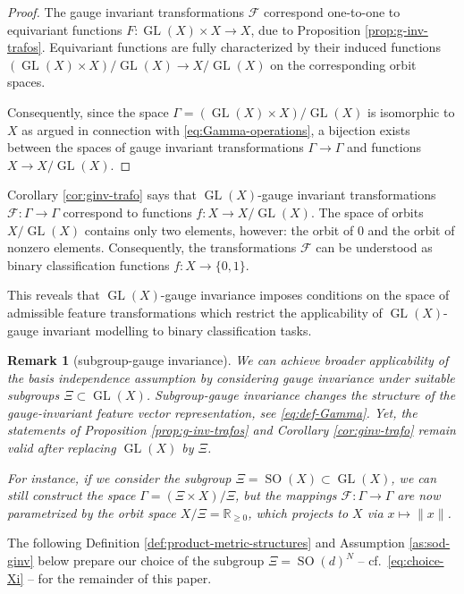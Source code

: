 \documentclass[10pt,reqno]{amsart}
\numberwithin{equation}{section}
\theoremstyle{bfnote}
\theoremstyle{bfdef}
\newtheorem{remark}[theorem]{Remark}
\newcommand{\mc}[1]{\mathcal{#1}}
\newcommand{\R}{\mathbb{R}}
\DeclareMathOperator{\SO}{SO}
\DeclareMathOperator{\GL}{GL}
\providecommand\X; %
\renewcommand{\X}{X}
\begin{document}
	\begin{proof}
		The gauge invariant transformations $\mc{F}$ correspond one-to-one to equivariant functions $F : \GL(\X) \times \X \to \X$, due to Proposition \ref{prop:g-inv-trafos}. Equivariant functions are fully characterized by their induced functions $(\GL(\X) \times \X) / \GL(\X) \to \X / \GL(X)$ on the corresponding orbit spaces.

		Consequently, since the space $\Gamma = (\GL(\X) \times \X) / \GL(\X)$ is isomorphic to $\X$ as argued in connection with \eqref{eq:Gamma-operations}, a bijection exists between the spaces of gauge invariant transformations $\Gamma \to \Gamma$ and functions $\X \to \X / \GL(\X)$.
	\end{proof}

	Corollary \ref{cor:ginv-trafo} says that $\GL(\X)$-gauge invariant transformations $\mc{F} : \Gamma \to \Gamma$ correspond to functions $f : \X \to \X / \GL(\X)$. The space of orbits  $\X / \GL(\X)$ contains only two elements, however: the orbit of 0 and the orbit of nonzero elements. Consequently,  the transformations $\mc{F}$ can be understood as binary classification functions $f : X \to \{0,1\}$.

	This reveals that $\GL(\X)$-gauge invariance imposes conditions on the space of admissible feature transformations which restrict the applicability of $\GL(\X)$-gauge invariant modelling to binary classification tasks.

	\begin{remark}[subgroup-gauge invariance]\label{rem:sub-ginv}
		We can achieve broader applicability of the basis independence assumption by considering gauge invariance under suitable \textit{subgroups} $\Xi \subset \GL(\X)$. Subgroup-gauge invariance changes the structure of the gauge-invariant feature vector representation, see \eqref{eq:def-Gamma}. Yet, the statements of Proposition \ref{prop:g-inv-trafos} and Corollary \ref{cor:ginv-trafo} remain valid after replacing $\GL(\X)$ by $\Xi$.
		
		For instance, if we consider the subgroup $\Xi = \SO(X) \subset \GL(X)$, we can still construct the space $\Gamma = (\Xi \times X) / \Xi$, but the mappings $\mc{F} : \Gamma \to \Gamma$ are now parametrized by the orbit space $X / \Xi = \R_{\geq 0}$, which projects to $X$ via $x \mapsto \|x\|$.
	\end{remark}

	The following Definition \eqref{def:product-metric-structures} and Assumption \ref{as:sod-ginv} below prepare our choice of the subgroup $\Xi = \SO(d)^N$ -- cf.~\eqref{eq:choice-Xi} -- for the remainder of this paper.
\end{document}
